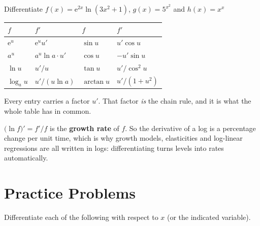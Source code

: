\begin{worked}{Differentiate $f(x)=\mathrm{e}^{2x}\ln(3x^{2}+1)$, $g(x)=5^{x^{2}}$ and $h(x)=x^{x}$}
\begin{center}\footnotesize
\begin{tabular}{llll}
  \hline
  $f$ & $f'$ & $f$ & $f'$\\
  \hline
  $\mathrm{e}^{u}$ & $\mathrm{e}^{u}u'$ & $\sin u$ & $u'\cos u$\\
  $a^{u}$ & $a^{u}\ln a\cdot u'$ & $\cos u$ & $-u'\sin u$\\
  $\ln u$ & $u'/u$ & $\tan u$ & $u'/\cos^{2}u$\\
  $\log_{a}u$ & $u'/(u\ln a)$ & $\arctan u$ & $u'/(1+u^{2})$\\
  \hline
\end{tabular}
\end{center}
Every entry carries a factor $u'$. That factor \emph{is} the chain rule, and
it is what the whole table has in common.

$\bigl(\ln f\bigr)'=f'/f$ is the \textbf{growth rate} of $f$. So the
derivative of a log is a percentage change per unit time, which is why
growth models, elasticities and log-linear regressions are all written in
logs: differentiating turns levels into rates automatically.
\end{worked}

\section{Practice Problems}

Differentiate each of the following with respect to $x$ (or the indicated
variable).

